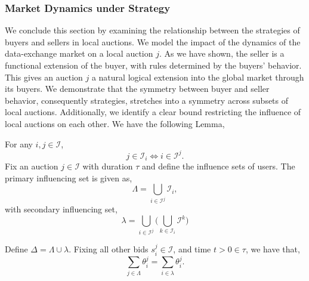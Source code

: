 \documentclass[sigconf, anonymous]{acmart}
\newcommand{\mcI}{\mathcal{I}}
\theoremstyle{definition}
\begin{document}
\subsubsection{Market Dynamics under Strategy}

We conclude this section by examining the relationship between the strategies of buyers and
sellers in local auctions. We model the impact of the dynamics of the
data-exchange market on a local auction $j$. As we have shown, the seller
is a functional extension of the buyer, with rules determined by the buyers'
behavior. This gives an auction $j$ a natural logical extension into the
global market through its buyers. We demonstrate that the symmetry between
buyer and seller behavior, consequently strategies, stretches into a symmetry across subsets of local
auctions. Additionally, we identify a clear bound restricting the influence of
local auctions on each other. We have the following Lemma,
{
\label{userunion}
For any $i,j\in \mcI$, 
\begin{equation}\label{jtoi}
j\in\mcI_i \Leftrightarrow i\in\mcI^j.
\end{equation}
Fix an auction $j\in\mcI$ with duration $\tau$ and define the influence sets of users. 
The primary influencing set is given as,
\begin{equation}\label{lambda}
    \Lambda = \displaystyle\bigcup_{i\in\mcI^j} \mcI_i,
\end{equation}
with secondary influencing set,
\begin{equation}\label{llambda}
    \lambda = \bigcup_{i\in\mcI^j} \bigg(\bigcup_{k\in\mcI_i} \mcI^k \bigg)
\end{equation}
\iffalse
(THE SELLERS ALL THE BUYERS IN $j$ HAVE IN COMMON! i.e. $j$ AND...)
\begin{equation}%
    \Lambda = \displaystyle\bigcap_{i\in\mcI^j} \mcI_i,
\end{equation}
(THE COLLECTION OF BUYERS FROM EACH $i$ THAT ARE COMMON ACROSS ALL THE $i$'s SELLER
POOLS)
\begin{equation}%
    \lambda = \bigcup_{i\in\mcI^j} \bigg(\bigcap_{k\in\mcI_i} \mcI^k \bigg)
\end{equation}
\fi
Define $\Delta = \Lambda \cup \lambda$.
Fixing all other bids $s_i^j \in \mcI$, and time $t>0\in\tau$, we have that,
\begin{equation}\label{union-eq}
    \displaystyle\sum_{j\in\Lambda} \theta_i^j = \sum_{i\in\lambda} \theta_i^j.
\end{equation}
}\\
\end{document}
